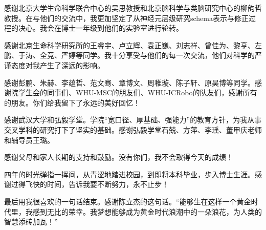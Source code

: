 \begin{acknowledgements}
  感谢北京大学生命科学联合中心的吴思教授和北京脑科学与类脑研究中心的柳韵哲教授。在与他们的交流中，我更加坚定了从神经元层级研究schema表示与修正过程的决心。我会在博士一年级到他们的实验室进行轮转。

  感谢北京生命科学研究所的王睿宇、卢立辉、袁正巍、刘志祥、曾佳为、黎亨、左鹏、于涛、全竞、严婷等同学。我十分享受与他们的每一次交流，他们对科学的严谨态度对我产生了深远的影响。

  感谢彭鹏、朱赫、李蕴哲、范文骞、章博文、周稚璇、陈子轩、原昊博等同学。感谢院学生会的同事们、WHU-MSC的朋友们、WHU-ICRobo的队友们，感谢所有的朋友。你们给我留下了永远的美好回忆！

  感谢武汉大学和弘毅学堂。学院“宽口径、厚基础、强能力”的教育方针，为我从事交叉学科的研究打下了坚实的基础。感谢弘毅学堂石兢、方萍、李瑶、董甲庆老师和辅导员王璐。

  感谢父母和家人长期的支持和鼓励。没有你们，我不会取得今天的成绩！

  四年的时光弹指一挥间，从青涩地踏进校园，到即将本科毕业，步入博士生涯。感谢过得飞快的时间，告诉我要不断努力，永不止步！

  最后用我很喜欢的一句话结束。感谢陈立杰的这句话。“能够生在这样一个黄金时代里，我感到无比的荣幸。我梦想能够成为黄金时代浪潮中的一朵浪花，为人类的智慧添砖加瓦！”
\end{acknowledgements}

